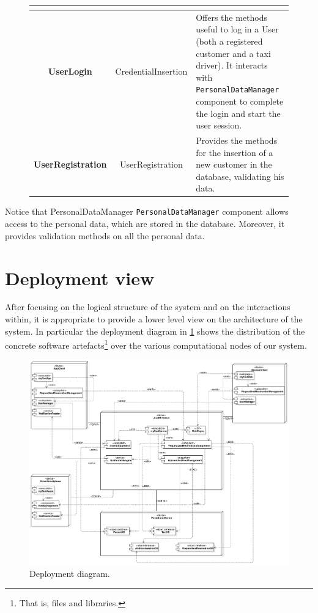 \clearpage
\begin{figure}\begin{tabularx}{\textwidth}{ >{\ttfamily\bfseries}C{\cW} >{\ttfamily}C{\iW} X }\toprule
{} &  & %
\\%
\toprule%
%	
	UserLogin%
	&%
	CredentialInsertion%
	&%
	Offers the methods useful to log in a User (both a registered customer and a taxi driver). It interacts with \texttt{Per\-son\-al\-Data\-Man\-ager} component to complete the login and start the user session.%
%	
\\%
\midrule%
%	
	UserRegistration%
	&%
	UserRegistration%
	&%
	Provides the methods for the insertion of a new customer in the database, validating his data.%
%	
\\%
\bottomrule%
\end{tabularx}%
\end{figure}

Notice that PersonalDataManager \texttt{Per\-son\-al\-Data\-Man\-ager} component allows access to the personal data, which are stored in the database. Moreover, it provides validation methods on all the personal data.


\section{Deployment view}\label{sec:deployment}
After focusing on the logical structure of the system and on the interactions within, it is appropriate to provide a lower level view on the architecture of the system. In particular the deployment diagram in \cref{fig:deployment} shows the distribution of the concrete software artefacts\footnote{That is, files and libraries.} over the various computational nodes of our system.

\begin{figure}%
	\centering%
	\includegraphics[width=\textwidth]{img/Deploy__DeploymentDiagram_4}%
	\caption{Deployment diagram.}\label{fig:deployment}%
\end{figure}

